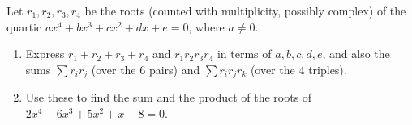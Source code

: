 Let $r_1,r_2,r_3,r_4$ be the roots (counted with multiplicity, possibly complex) of the quartic $ax^4+bx^3+cx^2+dx+e=0$, where $a\ne0$.
\begin{enumerate}
\item Express $r_1+r_2+r_3+r_4$ and $r_1r_2r_3r_4$ in terms of $a,b,c,d,e$, and also the sums $\sum r_ir_j$ (over the $6$ pairs) and $\sum r_ir_jr_k$ (over the $4$ triples).
\item Use these to find the sum and the product of the roots of $2x^4-6x^3+5x^2+x-8=0$.
\end{enumerate}
